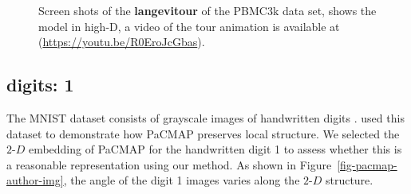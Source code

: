 \documentclass[
  12pt]{article}
\newcommand\gD{$2\text{-}D$}
\begin{document}
\begin{figure}[H]
\begin{minipage}{0.33\linewidth}
{}

\subcaption{\label{fig-pbmc2_sc5}}

\end{minipage}%
%
\begin{minipage}{0.33\linewidth}


\subcaption{\label{fig-pbmc2_sc6}}

\end{minipage}%

\caption{\label{fig-pbmc2_sc}Screen shots of the \textbf{langevitour} of
the PBMC3k data set, shows the model in high-D, a video of the tour
animation is available at (\url{https://youtu.be/R0EroJcGbas}).}

\end{figure}%

\subsection{digits: 1}\label{digits-1}

The MNIST dataset consists of grayscale images of handwritten digits
\citep{lecun2010}. \citet{yingfan2021} used this dataset to demonstrate
how PaCMAP preserves local structure. We selected the \gD{} embedding of
PaCMAP for the handwritten digit 1 to assess whether this is a
reasonable representation using our method. As shown in
Figure~\ref{fig-pacmap-author-img}, the angle of the digit 1 images
varies along the \gD{} structure.
\end{document}
